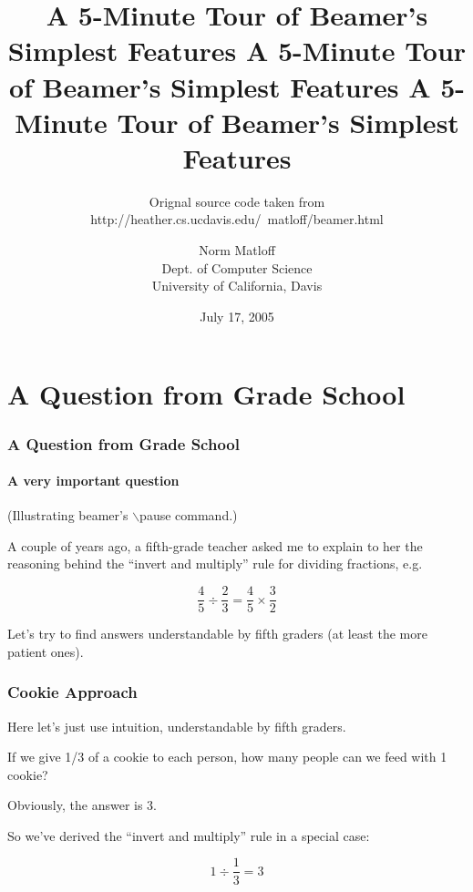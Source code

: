 \documentclass{beamer}
\title{A 5-Minute Tour of Beamer's Simplest Features A 5-Minute Tour of Beamer's Simplest Features A 5-Minute Tour of Beamer's Simplest Features}
\subtitle{Orignal source code taken from  http://heather.cs.ucdavis.edu/~matloff/beamer.html}
\author{\small Norm Matloff \\
    Dept. of Computer Science \\
    University of California, Davis \\
}
\date{July 17, 2005}
\begin{document}
\coverslide


\begin{frame}
\titlepage
\end{frame}

\section{A Question from Grade School}

\begin{frame}
\end{frame}

\begin{frame}
\frametitle{A Question from Grade School}
\framesubtitle{A very important question}

(Illustrating {\sc beamer}'s $\backslash$pause command.)
\vskip 0.3in

A couple of years ago, a fifth-grade teacher asked me to explain to her
the reasoning behind the ``invert and multiply'' rule for dividing
fractions, e.g.

\pause  %

$$
\frac{4}{5} \div \frac{2}{3} = \frac{4}{5} \times \frac{3}{2}
$$

\pause

Let's try to find answers understandable by fifth graders (at least the
more patient ones).

\end{frame}

\begin{frame}
\frametitle{Cookie Approach}

Here let's just use intuition, understandable by fifth graders.

\pause

If we give 1/3 of a cookie to each person, how many people can we
feed with 1 cookie?  

\pause

Obviously, the answer is 3.

So we've derived the ``invert and multiply'' rule in a special case:

$$
1 \div \frac{1}{3} = 3
$$

\end{frame}
\end{document}
